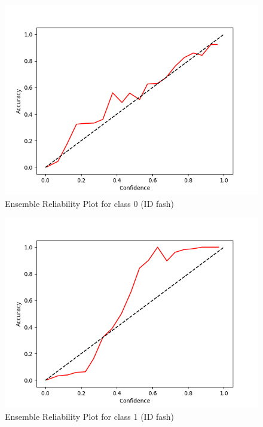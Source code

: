 \documentclass[11pt]{article}
\begin{document}
\begin{figure}[htbp]
\centering
\includegraphics[width=.9\linewidth]{./ens_fash_rel_0.png}
\caption{\label{fig:org9f5f3da}
Ensemble Reliability Plot for class 0 (ID fash)}
\end{figure}

\begin{figure}[htbp]
\centering
\includegraphics[width=.9\linewidth]{./ens_fash_rel_1.png}
\caption{\label{fig:orgca3bd5f}
Ensemble Reliability Plot for class 1 (ID fash)}
\end{figure}
\end{document}
